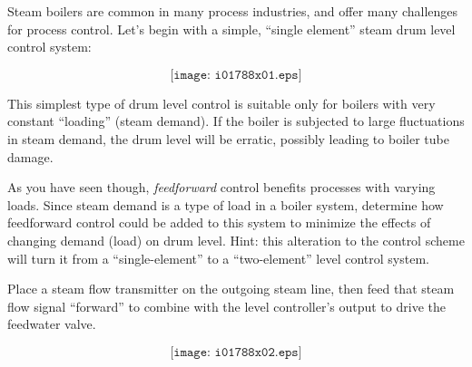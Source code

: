 

Steam boilers are common in many process industries, and offer many challenges for process control.  Let's begin with a simple, ``single element'' steam drum level control system:

$$\texttt{[image: i01788x01.eps]}$$

This simplest type of drum level control is suitable only for boilers with very constant ``loading'' (steam demand).  If the boiler is subjected to large fluctuations in steam demand, the drum level will be erratic, possibly leading to boiler tube damage.

As you have seen though, {\it feedforward} control benefits processes with varying loads.  Since steam demand is a type of load in a boiler system, determine how feedforward control could be added to this system to minimize the effects of changing demand (load) on drum level.  Hint: this alteration to the control scheme will turn it from a ``single-element'' to a ``two-element'' level control system.







Place a steam flow transmitter on the outgoing steam line, then feed that steam flow signal ``forward'' to combine with the level controller's output to drive the feedwater valve.







$$\texttt{[image: i01788x02.eps]}$$




